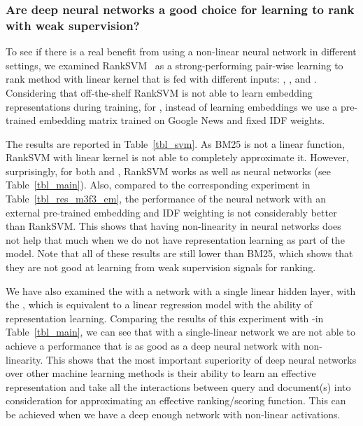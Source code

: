 
\subsubsection{Are deep neural networks a good choice for learning to rank with weak supervision?}
%
To see if there is a real benefit from using a non-linear neural network in different settings, we examined RankSVM~\citep{Joachims:2002} as a strong-performing pair-wise learning to rank method with linear kernel that is fed with different inputs: \feedone, \feedtwo, and \feedthree. Considering that off-the-shelf RankSVM is not able to learn embedding representations during training, for \feedthree, instead of learning embeddings we use a pre-trained embedding matrix trained on Google News and fixed IDF weights. 

The results are reported in Table~\ref{tbl_svm}. As BM25 is not a linear function, RankSVM with linear kernel is not able to completely approximate it. However, surprisingly, for both \feedone and \feedtwo, RankSVM works as well as neural networks (see Table~\ref{tbl_main}). 
%
Also, compared to the corresponding experiment in Table~\ref{tbl_res_m3f3_em}, the performance of the neural network with an external pre-trained embedding and IDF weighting is not considerably better than RankSVM. 
This shows that having non-linearity in neural networks does not help that much when we do not have representation learning as part of the model.
%
Note that all of these results are still lower than BM25, which shows that they are not good at learning from weak supervision signals for ranking. 
%

We have also examined the \modelone with a network with a single linear hidden layer, with the \feedthree, which is equivalent to a linear regression model with the ability of representation learning. 
Comparing the results of this experiment with \mone-\fthree in Table~\ref{tbl_main}, we can see that with a single-linear network we are not able to achieve a performance that is as good as a deep neural network with non-linearity.
%
This shows that the most important superiority of deep neural networks over other machine learning methods is their ability to learn an effective representation and take all the interactions between query and document(s) into consideration for approximating an effective ranking/scoring function. 
This can be achieved when we have a deep enough network with non-\:linear activations.

